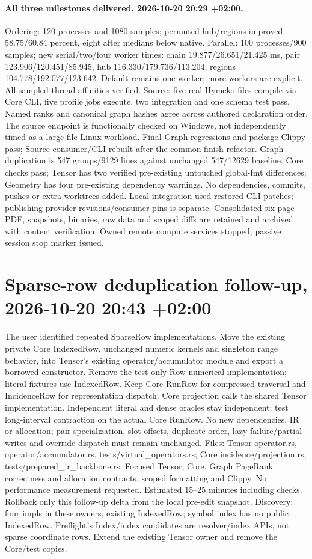 \documentclass[11pt,a4paper]{article}
\begin{document}
\paragraph{All three milestones delivered, 2026-10-20 20:29 +02:00.}
Ordering: 120 processes and 1080 samples; permuted hub/regions improved 58.75/60.84
percent, eight after medians below native. Parallel: 100 processes/900 samples;
new serial/two/four worker times: chain 19.877/26.651/21.425 ms, pair
123.906/120.451/85.945, hub 116.330/179.736/113.204, regions
104.778/192.077/123.642. Default remains one worker; more workers are explicit.
All sampled thread affinities verified. Source: five real Hymeko files compile via
Core CLI, five profile jobs execute, two integration and one schema test pass.
Named ranks and canonical graph hashes agree across authored declaration order.
The source endpoint is functionally checked on Windows, not independently timed as
a large-file Linux workload. Final Graph regressions and package Clippy pass;
Source consumer/CLI rebuilt after the common finish refactor. Graph duplication is
547 groups/9129 lines against unchanged 547/12629 baseline. Core checks pass;
Tensor has two verified pre-existing untouched global-fmt differences; Geometry has
four pre-existing dependency warnings. No dependencies, commits, pushes or extra
worktrees added. Local integration used restored CLI patches; publishing provider
revisions/consumer pins is separate. Consolidated six-page PDF, snapshots, binaries,
raw data and scoped diffs are retained and archived with content verification.
Owned remote compute services stopped; passive session stop marker issued.
\section*{Sparse-row deduplication follow-up, 2026-10-20 20:43 +02:00}
The user identified repeated SparseRow implementations. Move the existing private
Core IndexedRow, unchanged numeric kernels and singleton range behavior, into
Tensor's existing operator/accumulator module and export a borrowed constructor.
Remove the test-only Row numerical implementation; literal fixtures use IndexedRow.
Keep Core RunRow for compressed traversal and IncidenceRow for representation dispatch.
Core projection calls the shared Tensor implementation. Independent literal and dense
oracles stay independent; test long-interval contraction on the actual Core RunRow.
No new dependencies, IR or allocation; pair specialization, slot offsets, duplicate
order, lazy failure/partial writes and override dispatch must remain unchanged.
Files: Tensor operator.rs, operator/accumulator.rs, tests/virtual\_operators.rs;
Core incidence/projection.rs, tests/prepared\_ir\_backbone.rs. Focused Tensor, Core,
Graph PageRank correctness and allocation contracts, scoped formatting and Clippy.
No performance measurement requested. Estimated 15--25 minutes including checks.
Rollback only this follow-up delta from the local pre-edit snapshot.
Discovery: four impls in these owners, existing IndexedRow; symbol index has no public
IndexedRow. Preflight's Index/index candidates are resolver/index APIs, not sparse
coordinate rows. Extend the existing Tensor owner and remove the Core/test copies.
\end{document}
